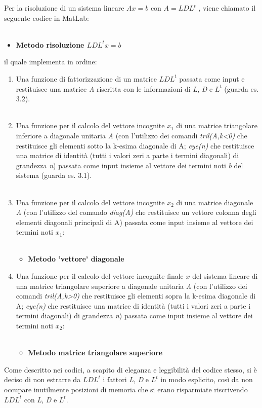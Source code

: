 Per la risoluzione di un sistema lineare $Ax=b$ con $A=LDL^t$ , viene chiamato il seguente codice in MatLab:\\\
\begin{itemize}
\item \textbf{Metodo risoluzione $LDL^tx=b$}

\end{itemize}
il quale implementa in ordine:
\begin{enumerate}
\item
Una funzione di fattorizzazione di un matrice $LDL^t$ passata come input e restituisce una matrice \textit{A} riscritta con le informazioni di \textit{L}, \textit{D} e $L^t$ (guarda es. 3.2).\\\
\item
Una funzione per il calcolo del vettore incognite $x_1$ di una matrice triangolare inferiore a diagonale unitaria \textit{A} (con l'utilizzo dei comandi \textit{tril(A,k<0)} che restituisce gli elementi sotto la k-esima diagonale di A; \textit{eye(n)} che restituisce una matrice di identità (tutti i valori zeri a parte i termini diagonali) di grandezza \textit{n}) passata come input insieme al vettore dei termini noti \textit{b} del sistema (guarda es. 3.1). \\\
\item
Una funzione per il calcolo del vettore incognite $x_2$ di una matrice diagonale \textit{A} (con l'utilizzo del comando \textit{diag(A)} che restituisce un vettore colonna degli elementi diagonali principali di A) passata come input insieme al vettore dei termini noti $x_1$:\\\
\begin{itemize}
\item \textbf{Metodo 'vettore' diagonale}

\end{itemize}
\item
Una funzione per il calcolo del vettore incognite finale $x$ del sistema lineare di una matrice triangolare superiore a diagonale unitaria \textit{A} (con l'utilizzo dei comandi \textit{tril(A,k>0)} che restituisce gli elementi sopra la k-esima diagonale di A; \textit{eye(n)} che restituisce una matrice di identità (tutti i valori zeri a parte i termini diagonali) di grandezza \textit{n}) passata come input insieme al vettore dei termini noti $x_2$:\\\
\begin{itemize}
\item \textbf{Metodo matrice triangolare superiore}

\end{itemize}
\end{enumerate}
Come descritto nei codici, a scapito di eleganza e leggibilità del codice stesso, si è deciso di non estrarre da $LDL^t$ i fattori \textit{L}, \textit{D} e $L^t$ in modo esplicito, così da non occupare inutilmente posizioni di memoria che si erano risparmiate riscrivendo $LDL^t$ con \textit{L}, \textit{D} e $L^t$.